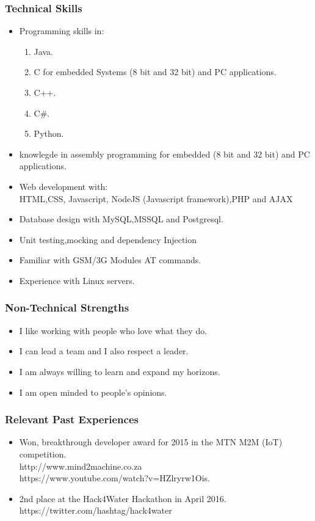 \documentclass[a4paper,12pt]{article}
\begin{document}
\subsubsection{Technical Skills}
\begin{itemize}
\item Programming skills in:
\begin{enumerate}
\item Java.
\item C for embedded Systems (8 bit and 32 bit) and PC applications.
\item C++.
\item C\#.
\item Python.
\end{enumerate}
\item knowlegde in assembly programming for embedded (8 bit and 32 bit) and PC applications.
\item Web development with:\\
HTML,CSS, Javascript, NodeJS (Javascript framework),PHP and AJAX
\item Database design with MySQL,MSSQL and Postgresql.
\item Unit testing,mocking and dependency Injection
\item Familiar with GSM/3G Modules AT commands.
\item Experience with Linux servers.
\end{itemize}
\subsubsection{Non-Technical Strengths}
\begin{itemize}
\item I like working with people who love what they do.
\item I can lead a team and I also respect a leader.
\item I am always willing to learn and expand my horizons.
\item I am open minded to people's opinions.
\end{itemize}
\subsubsection{Relevant Past Experiences}
\begin{itemize}
\item Won, breakthrough developer award for 2015 in the MTN M2M (IoT) competition.\\
http://www.mind2machine.co.za \\
https://www.youtube.com/watch?v=HZlryrw1Ois.
\item 2nd place at the Hack4Water Hackathon in April 2016.\\
https://twitter.com/hashtag/hack4water
\end{itemize}
\end{document}
